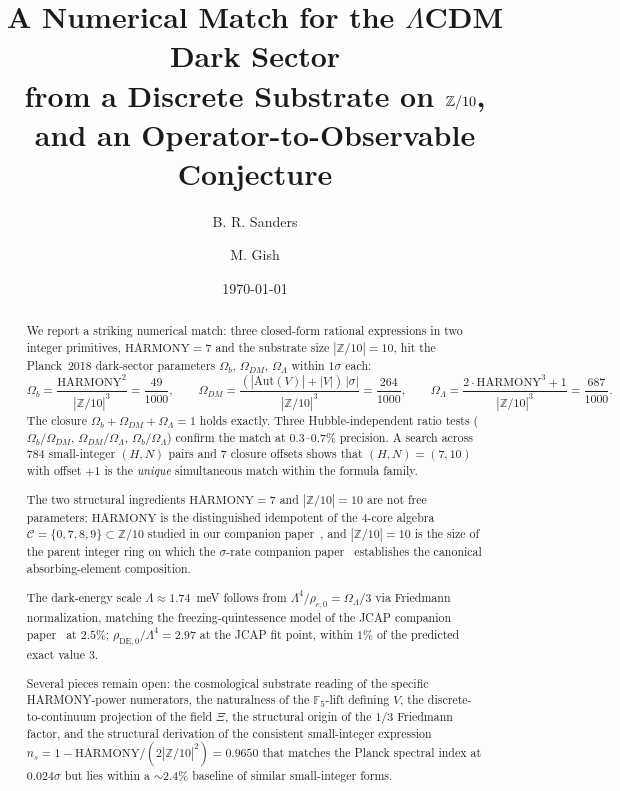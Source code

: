 \documentclass[11pt,reqno]{amsart}
\title[Dark-Sector Trinity from Z/10]
{A Numerical Match for the $\Lambda$CDM Dark Sector \\
 from a Discrete Substrate on $\Z/10$, \\
 and an Operator-to-Observable Conjecture}
\author{B. R. Sanders}
\author{M. Gish}
\date{\today}
\theoremstyle{plain}
\theoremstyle{definition}
\theoremstyle{remark}
\newcommand{\Z}{\mathbb{Z}}
\newcommand{\F}{\mathbb{F}}
\newcommand{\Aut}{\mathrm{Aut}}
\begin{document}
\begin{abstract}
We report a striking numerical match: three closed-form rational
expressions in two integer primitives, $\mathrm{HARMONY} = 7$ and
the substrate size $|\Z/10| = 10$, hit the Planck~2018
dark-sector parameters
$\Omega_b$, $\Omega_{DM}$, $\Omega_\Lambda$ within $1\sigma$ each:
\[
  \Omega_b = \frac{\mathrm{HARMONY}^{2}}{|\Z/10|^{3}} = \frac{49}{1000},\qquad
  \Omega_{DM} = \frac{(|\Aut(V)| + |V|)\,|\sigma|}{|\Z/10|^{3}} = \frac{264}{1000},\qquad
  \Omega_\Lambda = \frac{2\cdot\mathrm{HARMONY}^{3} + 1}{|\Z/10|^{3}} = \frac{687}{1000}.
\]
The closure $\Omega_b + \Omega_{DM} + \Omega_\Lambda = 1$ holds
exactly. Three Hubble-independent ratio tests
($\Omega_b/\Omega_{DM}$, $\Omega_{DM}/\Omega_\Lambda$,
$\Omega_b/\Omega_\Lambda$) confirm the match at $0.3$--$0.7\%$
precision. A search across $784$ small-integer $(H, N)$ pairs and
$7$ closure offsets shows that $(H, N) = (7, 10)$ with offset
$+1$ is the \emph{unique} simultaneous match within the formula
family.

The two structural ingredients $\mathrm{HARMONY} = 7$ and
$|\Z/10| = 10$ are not free parameters: $\mathrm{HARMONY}$ is the
distinguished idempotent of the $4$-core algebra
$\mathcal{C} = \{0, 7, 8, 9\} \subset \Z/10$ studied in our
companion paper~\cite{SandersGish2026FourCore}, and
$|\Z/10| = 10$ is the size of the parent integer ring on which the
$\sigma$-rate companion paper~\cite{SandersGish2026SigmaRate}
establishes the canonical absorbing-element composition.

The dark-energy scale $\Lambda \approx 1.74$~meV follows from
$\Lambda^{4}/\rho_{c,0} = \Omega_\Lambda/3$ via Friedmann
normalization, matching the freezing-quintessence model of the
JCAP companion paper~\cite{SandersGish2026JCAP} at $2.5\%$;
$\rho_{\mathrm{DE},0}/\Lambda^{4} = 2.97$ at the JCAP fit point,
within $1\%$ of the predicted exact value $3$.

Several pieces remain open: the cosmological substrate reading of
the specific HARMONY-power numerators, the naturalness of the
$\F_5$-lift defining $V$, the discrete-to-continuum projection
of the field $\Xi$, the structural origin of the $1/3$ Friedmann
factor, and the structural derivation of the consistent
small-integer expression
$n_s = 1 - \mathrm{HARMONY}/(2|\Z/10|^{2}) = 0.9650$ that
matches the Planck spectral index at $0.024\sigma$ but lies
within a $\sim 2.4\%$ baseline of similar small-integer forms.


\end{abstract}
\end{document}
